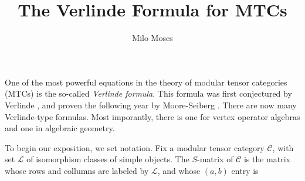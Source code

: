 \documentclass{article}
\title{The Verlinde Formula for MTCs}
\author{Milo Moses}
\theoremstyle{definition}
\numberwithin{figure}{section}
\begin{document}
\maketitle

\newcommand{\RR}{\mathbb{R}}
\newcommand{\HH}{\mathbb{H}}
\newcommand{\NN}{\mathbb{N}}
\newcommand{\QQ}{\mathbb{Q}}
\newcommand{\CC}{\mathbb{C}}
\newcommand{\FF}{\mathbb{F}}
\newcommand{\ZZ}{\mathbb{Z}}
\newcommand{\Zcal}{\mathcal{Z}}
\newcommand{\Ncal}{\mathcal{N}}
\newcommand{\LL}{\mathscr{L}}
\newcommand{\TT}{\mathcal{T}}
\newcommand{\Ccat}{\mathscr{C}}
\newcommand{\Dcat}{\mathscr{D}}
\newcommand{\Ecat}{\mathscr{E}}
\newcommand{\st}{\,\,\mathrm{s.t.}\,\,}
\newcommand{\mm}{\mathfrak{m}}
\newcommand{\pp}{\mathfrak{p}}
\newcommand{\Hom}{\mathrm{Hom}}
\newcommand{\Aut}{\mathrm{Aut}}
\newcommand{\Frac}{\mathrm{Frac}}
\newcommand{\tr}{\mathrm{tr}}
\newcommand{\op}{\mathrm{op}}
\newcommand{\res}{\mathrm{res}}
\newcommand{\im}{\mathrm{im}}
\newcommand{\ev}{\mathrm{ev}}
\newcommand{\coev}{\mathrm{coev}}
\newcommand{\id}{\mathrm{id}}
\newcommand{\coker}{\mathrm{coker}}
\newcommand{\SL}{\mathrm{SL}}
\newcommand{\End}{\mathrm{End}}
\newcommand{\Rep}{\bold{Rep}}
\newcommand{\Set}{\bold{Set}}
\newcommand{\Vecc}{\bold{Vec}}
\newcommand{\Top}{\bold{Top}}
\newcommand{\Grp}{\bold{Grp}}
\newcommand{\Hilb}{\bold{Hilb}}
\newcommand{\Bord}{\bold{Bord}}
\newcommand{\Cat}{\bold{Cat}}
\newcommand{\0}{\left|0\right>}
\newcommand{\1}{\left|1\right>}
\newcommand{\nullclass}{\left|\bold{0}\right>}
\newcommand{\alphaclass}{\left|\alpha\right>}
\newcommand{\betaclass}{\left|\beta\right>}
\newcommand{\alphabetaclass}{\left|\alpha\beta\right>}
\newcommand{\ppsi}{\left|\psi\right>}
\newcommand{\pphi}{\left|\phi\right>}
\newcommand{\func}{\mathrm{func}}
\newcommand{\bigleadsto}{\mathlarger{\mathlarger{\mathlarger{\leadsto}}}}
\newcommand{\vin}{\rotatebox[origin=c]{-90}{$\in$}}


One of the most powerful equations in the theory of modular tensor categories (MTCs) is the so-called \textit{Verlinde formula}. This formula was first conjectured by Verlinde \cite{verlinde1988fusion}, and proven the following year by Moore-Seiberg \cite{moore1989classical}. There are now many Verlinde-type formulas. Most imporantly, there is one for vertex operator algebras and one in algebraic geometry.

To begin our exposition, we set notation.  Fix a modular tensor category $\Ccat$, with set $\LL$ of isomorphism classes of simple objects. The $S$-matrix of $\Ccat$ is the matrix whose rows and collumns are labeled by $\LL$, and whose $(a,b)$ entry is
\end{document}
